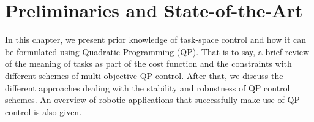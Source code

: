 \graphicspath{{Figures/}}
\newcommand{\proportional}{\mathbf{P}}
\newcommand{\derivative}{\mathbf{D}}
\chapter{Preliminaries and State-of-the-Art} \label{chap:background}
  
In this chapter, we present prior knowledge of task-space control and how it can be formulated using Quadratic Programming (QP). That is to say, a brief review of the meaning of tasks as part of the cost function and the constraints with different schemes of multi-objective QP control. After that, we discuss the different approaches dealing with the stability and robustness of QP control schemes. An overview of robotic applications that successfully make use of QP control is also given.
